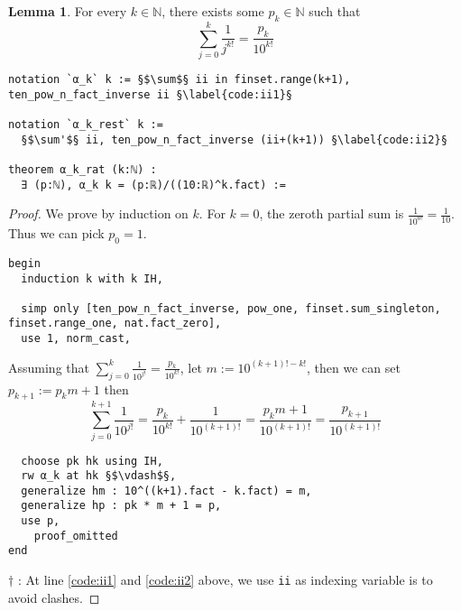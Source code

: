 \documentclass{report}
\theoremstyle{definition}
\newtheorem{lemma}{Lemma}[section]
\theoremstyle{plain}
\begin{document}
\begin{lemma}\label{lemma:partialSum}
For every $k\in\mathbb N$, there exists some $p_k\in\mathbb N$ such that
$$
\sum_{j=0}^k\frac1{j^{k!}}=\frac{p_k}{10^{k!}}
$$
\begin{verbatim}
notation `α_k` k := §$\sum$§ ii in finset.range(k+1), ten_pow_n_fact_inverse ii §\label{code:ii1}§

notation `α_k_rest` k := 
  §$\sum'$§ ii, ten_pow_n_fact_inverse (ii+(k+1)) §\label{code:ii2}§

theorem α_k_rat (k:ℕ) : 
  ∃ (p:ℕ), α_k k = (p:ℝ)/((10:ℝ)^k.fact) :=
\end{verbatim}
\end{lemma}

\begin{proof}
We prove by induction on $k$. For $k=0$, the zeroth partial sum is $\frac1{10^{0!}}=\frac1{10}$. Thus we can pick $p_0=1$.

\begin{verbatim}
begin
  induction k with k IH,

  simp only [ten_pow_n_fact_inverse, pow_one, finset.sum_singleton, finset.range_one, nat.fact_zero], 
  use 1, norm_cast, 
\end{verbatim}

Assuming that $\sum_{j=0}^k\frac1{10^{j!}}=\frac{p_k}{10^{k!}}$, let $m:=10^{(k+1)!-k!}$, then we can set $p_{k+1}:=p_k m+1$ then
$$
\sum_{j=0}^{k+1}\frac1{10^{j!}}=\frac{p_k}{10^{k!}}+\frac1{10^{(k+1)!}}=\frac{p_km+1}{10^{(k+1)!}}=\frac{p_{k+1}}{10^{(k+1)!}}
$$
\begin{verbatim}                                                                            
  choose pk hk using IH,
  rw α_k at hk §$\vdash$§,
  generalize hm : 10^((k+1).fact - k.fact) = m,
  generalize hp : pk * m + 1 = p,
  use p,
    proof_omitted
end
\end{verbatim}
$\dagger$ : At line \ref{code:ii1} and \ref{code:ii2} above, we use {\tt \small ii} as indexing variable is to avoid clashes.
\end{proof}
\end{document}
